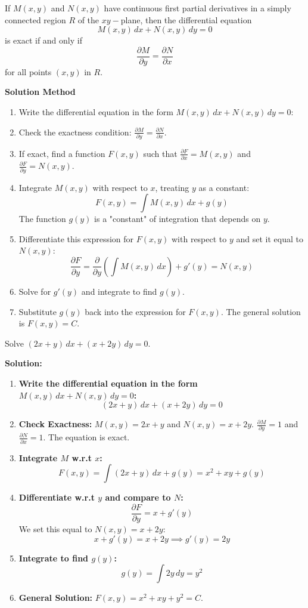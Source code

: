 \begin{theorem}
  If $M(x,y)$ and $N(x,y)$ have continuous first partial derivatives in a simply connected region $R$ of the $xy-$plane, then the differential equation
  \[ M(x,y)\,dx + N(x,y)\,dy = 0 \]
  is exact if and only if
  $$ \frac{\partial M}{\partial y} = \frac{\partial N}{\partial x} $$
  for all points $(x,y)$ in $R$.
\end{theorem}

\textbf{Solution Method}
\begin{enumerate}
    \item Write the differential equation in the form $M(x,y)\,dx + N(x,y)\,dy = 0$:
    \item Check the exactness condition: $\frac{\partial M}{\partial y} = \frac{\partial N}{\partial x}$.
    \item If exact, find a function $F(x,y)$ such that $\frac{\partial F}{\partial x} = M(x,y)$ and $\frac{\partial F}{\partial y} = N(x,y)$.
    \item Integrate $M(x,y)$ with respect to $x$, treating $y$ as a constant:
    $$ F(x,y) = \int M(x,y) \, dx + g(y) $$
    The function $g(y)$ is a "constant" of integration that depends on $y$.
    \item Differentiate this expression for $F(x,y)$ with respect to $y$ and set it equal to $N(x,y)$:
    $$ \frac{\partial F}{\partial y} = \frac{\partial}{\partial y} \left( \int M(x,y) \, dx \right) + g'(y) = N(x,y) $$
    \item Solve for $g'(y)$ and integrate to find $g(y)$.
    \item Substitute $g(y)$ back into the expression for $F(x,y)$. The general solution is $F(x,y) = C$.
\end{enumerate}

\begin{example}
Solve $(2x+y)\,dx + (x+2y)\,dy = 0$.

\textbf{Solution:}

\begin{enumerate}
    \item \textbf{Write the differential equation in the form $M(x,y)\,dx + N(x,y)\,dy = 0$:}
    $$(2x+y)\,dx + (x+2y)\,dy = 0$$
    \item \textbf{Check Exactness:} $M(x,y)=2x+y$ and $N(x,y)=x+2y$.
    $\frac{\partial M}{\partial y} = 1$ and $\frac{\partial N}{\partial x} = 1$. The equation is exact.
    \item \textbf{Integrate $M$ w.r.t $x$:}
    $$ F(x,y) = \int (2x+y) \, dx + g(y) = x^2+xy+g(y) $$
    \item \textbf{Differentiate w.r.t $y$ and compare to $N$:}
    $$ \frac{\partial F}{\partial y} = x+g'(y) $$
    We set this equal to $N(x,y)=x+2y$:
    $$ x+g'(y) = x+2y \implies g'(y) = 2y $$
    \item \textbf{Integrate to find $g(y)$:}
    $$ g(y) = \int 2y \, dy = y^2 $$
    \item \textbf{General Solution:} $F(x,y) = x^2+xy+y^2=C$.
\end{enumerate}
\end{example}

